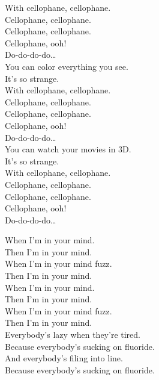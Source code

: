 With cellophane, cellophane. \\
Cellophane, cellophane. \\
Cellophane, cellophane. \\
Cellophane, ooh! \\
Do-do-do-do… \\

You can color everything you see. \\
It's so strange. \\

With cellophane, cellophane. \\
Cellophane, cellophane. \\
Cellophane, cellophane. \\
Cellophane, ooh! \\
Do-do-do-do… \\

You can watch your movies in 3D. \\
It's so strange. \\

With cellophane, cellophane. \\
Cellophane, cellophane. \\
Cellophane, cellophane. \\
Cellophane, ooh! \\
Do-do-do-do… \\





When I'm in your mind. \\
Then I'm in your mind. \\
When I'm in your mind fuzz. \\
Then I'm in your mind. \\

When I'm in your mind. \\
Then I'm in your mind. \\
When I'm in your mind fuzz. \\
Then I'm in your mind. \\

Everybody's lazy when they're tired. \\
Because everybody's sucking on fluoride. \\
And everybody's filing into line. \\
Because everybody's sucking on fluoride. \\

